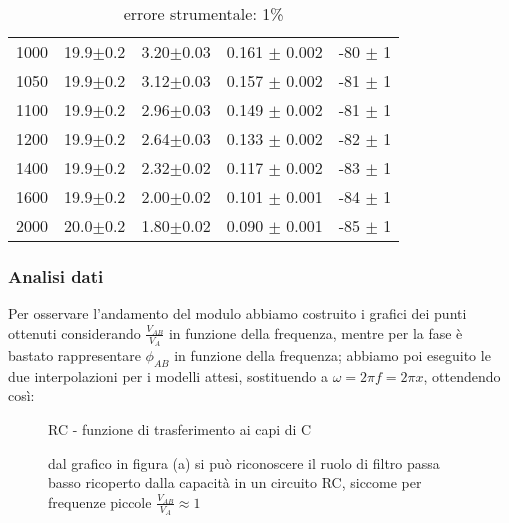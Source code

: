 \documentclass{article}
\theoremstyle{definition}
\begin{document}
\begin{table}[!htbp]
{\begin{tabular}{c|c|c|c|c}
        1000    & 19.9$\pm$0.2         & 3.20$\pm$0.03  & 0.161 $\pm$ 0.002 & -80 $\pm $ 1\\
        1050    & 19.9$\pm$0.2         & 3.12$\pm$0.03        & 0.157 $\pm$ 0.002 & -81 $ \pm$ 1\\
        1100    & 19.9$\pm$0.2         & 2.96$\pm$0.03        & 0.149 $\pm$ 0.002 & -81 $ \pm$ 1\\
        1200    & 19.9$\pm$0.2         & 2.64$\pm$0.03        & 0.133 $\pm$ 0.002 & -82 $\pm $ 1\\
        1400    & 19.9$\pm$0.2         & 2.32$\pm$0.02        & 0.117 $\pm$ 0.002 & -83 $\pm $ 1\\
        1600    & 19.9$\pm$0.2         & 2.00$\pm$0.02     & 0.101 $\pm$ 0.001 & -84 $\pm $ 1\\
        2000    & 20.0$\pm$0.2     & 1.80$\pm$0.02  & 0.090 $\pm$ 0.001 & -85 $ \pm$ 1\\

        \hline
        \hline
    \end{tabular}
    }
\caption{errore strumentale: 1\%}
\end{table}

\subsubsection*{Analisi dati}
Per osservare l'andamento del modulo abbiamo costruito i grafici dei punti ottenuti considerando \(\frac{V_{AB}}{ V_{A}}\) in funzione della frequenza, mentre per la fase è bastato rappresentare \(\phi_{AB}\) in funzione della frequenza; abbiamo poi eseguito le due interpolazioni per i modelli attesi, sostituendo a \(\omega = 2\pi f = 2 \pi x\), ottendendo così:

\begin{figure}[!h]
\caption{RC - funzione di trasferimento ai capi di C}

\caption*{dal grafico in figura (a) si può riconoscere il ruolo di filtro passa basso ricoperto dalla capacità in un circuito RC, siccome per frequenze piccole \(\frac{V_{AB}}{V_{A}} \approx 1\) }
\label{fig:RC_su_C}
\end{figure}
\end{document}
